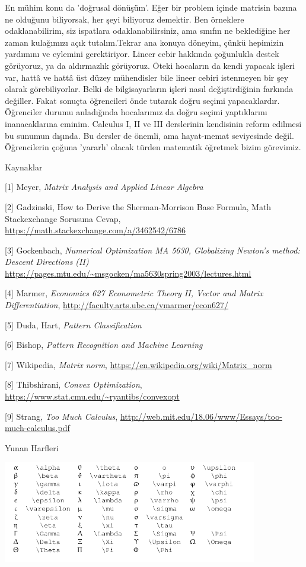 \documentclass[12pt,fleqn]{article}\usepackage{../../common}
\begin{document}
En mühim konu da 'doğrusal dönüşüm'. Eğer bir problem içinde matrisin bazına ne
olduğunu biliyorsak, her şeyi biliyoruz demektir. Ben örneklere odaklanabilirim,
siz ispatlara odaklanabilirsiniz, ama sınıfın ne beklediğine her zaman
kulağımızı açık tutalım.Tekrar ana konuya döneyim, çünkü hepimizin yardımını ve
eylemini gerektiriyor. Lineer cebir hakkında çoğunlukla destek görüyoruz, ya da
aldırmazlık görüyoruz. Öteki hocaların da kendi yapacak işleri var, hattâ ve
hattâ üst düzey mühendisler bile lineer cebiri istenmeyen bir şey olarak
görebiliyorlar. Belki de bilgisayarların işleri nasıl değiştirdiğinin farkında
değiller. Fakat sonuçta öğrencileri önde tutarak doğru seçimi
yapacaklardır. Öğrenciler durumu anladığında hocalarımız da doğru seçimi
yaptıklarını inanacaklarına eminim. Calculus I, II ve III derslerinin kendisinin
reform edilmesi bu sunumun dışında. Bu dersler de önemli, ama hayat-memat
seviyesinde değil. Öğrencilerin çoğuna 'yararlı' olacak türden matematik
öğretmek bizim görevimiz.


Kaynaklar 

[1] Meyer, {\em Matrix Analysis and Applied Linear Algebra}

[2] Gadzinski, {How to Derive the Sherman-Morrison Base Formula, Math Stackexchange Sorusuna Cevap}, 
    \url{https://math.stackexchange.com/a/3462542/6786}

[3] Gockenbach, {\em Numerical Optimization MA 5630, Globalizing Newton's method: Descent Directions (II)}
    \url{https://pages.mtu.edu/~msgocken/ma5630spring2003/lectures.html}

[4] Marmer, {\em Economics 627 Econometric Theory II, Vector and Matrix Differentiation}, 
    \url{http://faculty.arts.ubc.ca/vmarmer/econ627/}
        
[5] Duda, Hart, {\em Pattern Classification}

[6] Bishop, {\em Pattern Recognition and Machine Learning}

[7] Wikipedia, {\em Matrix norm}, 
    \url{https://en.wikipedia.org/wiki/Matrix_norm}

[8] Thibshirani, {\em Convex Optimization}, 
    \url{https://www.stat.cmu.edu/~ryantibs/convexopt}

[9] Strang, {\em Too Much Calculus},
    \url{http://web.mit.edu/18.06/www/Essays/too-much-calculus.pdf}
    
\newpage 

Yunan Harfleri

\includegraphics[width=30em]{../../algs/algs_999_zapp/letters.png}
\end{document}

